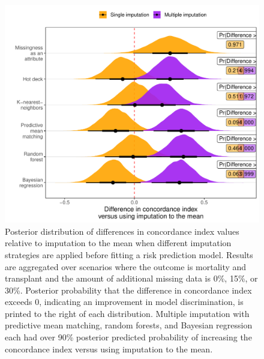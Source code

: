 \documentclass{article}
\begin{document}
\begin{figure}

{\centering \includegraphics{doc_arxiv_files/figure-latex/fig_md_strat_infer_auc-1} 

}

\caption{Posterior distribution of differences in concordance index values relative to imputation to the mean when different imputation strategies are applied before fitting a risk prediction model. Results are aggregated over scenarios where the outcome is mortality and transplant and the amount of additional missing data is 0\%, 15\%, or 30\%. Posterior probability that the difference in concordance index exceeds 0, indicating an improvement in model discrimination, is printed to the right of each distribution. Multiple imputation with predictive mean matching, random forests, and Bayesian regression each had over 90\% posterior predicted probability of increasing the concordance index versus using imputation to the mean.}\label{fig:fig_md_strat_infer_auc}
\end{figure}

\clearpage
\end{document}
